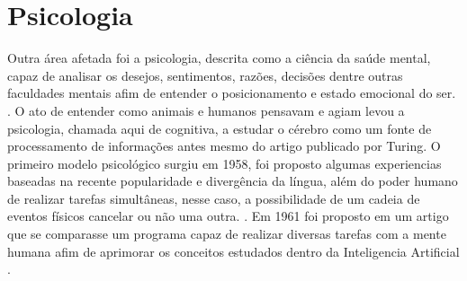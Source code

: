 \section{Psicologia}

Outra área afetada foi a psicologia, descrita como a ciência da saúde mental, capaz de analisar os desejos, sentimentos, razões, decisões dentre outras faculdades mentais afim de entender o posicionamento e estado emocional do ser. \cite[4-6]{william1890principles}. O ato de entender como animais e humanos pensavam e agiam levou a psicologia, chamada aqui de cognitiva, a estudar o cérebro como um fonte de processamento de informações antes mesmo do artigo publicado por Turing. O primeiro modelo psicológico surgiu em 1958, foi proposto algumas experiencias baseadas na recente popularidade e divergência da língua, além do poder humano de realizar tarefas simultâneas, nesse caso, a possibilidade de um cadeia de eventos físicos cancelar ou não uma outra. \cite[4-7]{broadbent1958perception}. Em 1961 foi proposto em um artigo que se comparasse um programa capaz de realizar diversas tarefas com a mente humana afim de aprimorar os conceitos estudados dentro da Inteligencia Artificial \cite[110]{newell1961gps}.
